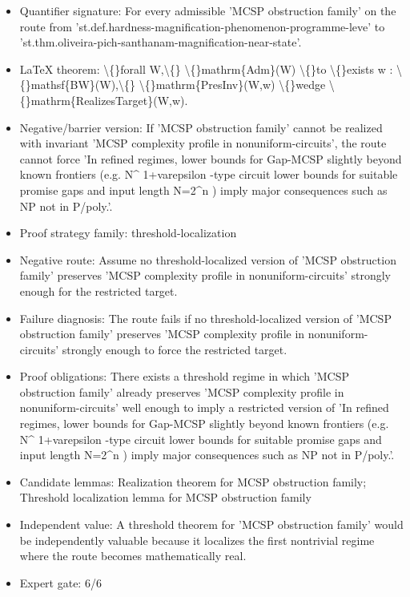 \documentclass[11pt]{article}
\begin{document}
\begin{itemize}
\item Quantifier signature: For every admissible 'MCSP obstruction family' on the route from 'st.def.hardness-magnification-phenomenon-programme-leve' to 'st.thm.oliveira-pich-santhanam-magnification-near-state'.
\item LaTeX theorem: \textbackslash\{\}forall W,\textbackslash\{\} \textbackslash\{\}mathrm\{Adm\}(W) \textbackslash\{\}to \textbackslash\{\}exists w : \textbackslash\{\}mathsf\{BW\}(W),\textbackslash\{\} \textbackslash\{\}mathrm\{PresInv\}(W,w) \textbackslash\{\}wedge \textbackslash\{\}mathrm\{RealizesTarget\}(W,w).
\item Negative/barrier version: If 'MCSP obstruction family' cannot be realized with invariant 'MCSP complexity profile in nonuniform-circuits', the route cannot force 'In refined regimes, lower bounds for Gap-MCSP slightly beyond known frontiers (e.g. N\textasciicircum{} 1+varepsilon -type circuit lower bounds for suitable promise gaps and input length N=2\textasciicircum{}n ) imply major consequences such as NP not in P/poly.'.
\item Proof strategy family: threshold-localization
\item Negative route: Assume no threshold-localized version of 'MCSP obstruction family' preserves 'MCSP complexity profile in nonuniform-circuits' strongly enough for the restricted target.
\item Failure diagnosis: The route fails if no threshold-localized version of 'MCSP obstruction family' preserves 'MCSP complexity profile in nonuniform-circuits' strongly enough to force the restricted target.
\item Proof obligations: There exists a threshold regime in which 'MCSP obstruction family' already preserves 'MCSP complexity profile in nonuniform-circuits' well enough to imply a restricted version of 'In refined regimes, lower bounds for Gap-MCSP slightly beyond known frontiers (e.g. N\textasciicircum{} 1+varepsilon -type circuit lower bounds for suitable promise gaps and input length N=2\textasciicircum{}n ) imply major consequences such as NP not in P/poly.'.
\item Candidate lemmas: Realization theorem for MCSP obstruction family; Threshold localization lemma for MCSP obstruction family
\item Independent value: A threshold theorem for 'MCSP obstruction family' would be independently valuable because it localizes the first nontrivial regime where the route becomes mathematically real.
\item Expert gate: 6/6
\end{itemize}
\end{document}
